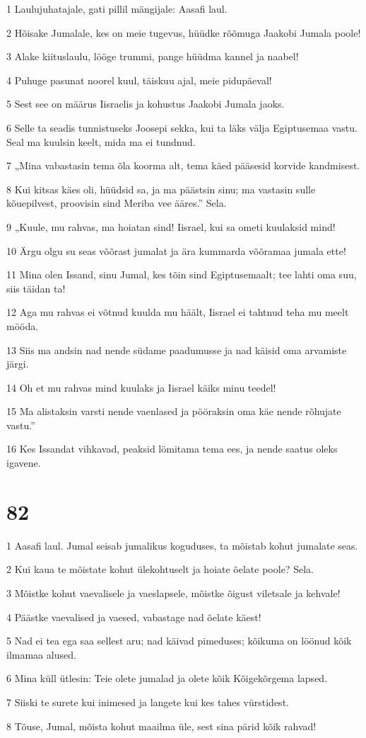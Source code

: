 \par 1 Laulujuhatajale, gati pillil mängijale: Aasafi laul.
\par 2 Hõisake Jumalale, kes on meie tugevus, hüüdke rõõmuga Jaakobi Jumala poole!
\par 3 Alake kiituslaulu, lööge trummi, pange hüüdma kannel ja naabel!
\par 4 Puhuge pasunat noorel kuul, täiskuu ajal, meie pidupäeval!
\par 5 Sest see on määrus Iisraelis ja kohustus Jaakobi Jumala jaoks.
\par 6 Selle ta seadis tunnistuseks Joosepi sekka, kui ta läks välja Egiptusemaa vastu. Seal ma kuulsin keelt, mida ma ei tundnud.
\par 7 „Mina vabastasin tema õla koorma alt, tema käed pääsesid korvide kandmisest.
\par 8 Kui kitsas käes oli, hüüdsid sa, ja ma päästsin sinu; ma vastasin sulle kõuepilvest, proovisin sind Meriba vee ääres.” Sela.
\par 9 „Kuule, mu rahvas, ma hoiatan sind! Iisrael, kui sa ometi kuulaksid mind!
\par 10 Ärgu olgu su seas võõrast jumalat ja ära kummarda võõramaa jumala ette!
\par 11 Mina olen Issand, sinu Jumal, kes tõin sind Egiptusemaalt; tee lahti oma suu, siis täidan ta!
\par 12 Aga mu rahvas ei võtnud kuulda mu häält, Iisrael ei tahtnud teha mu meelt mööda.
\par 13 Siis ma andsin nad nende südame paadumusse ja nad käisid oma arvamiste järgi.
\par 14 Oh et mu rahvas mind kuulaks ja Iisrael käiks minu teedel!
\par 15 Ma alistaksin varsti nende vaenlased ja pööraksin oma käe nende rõhujate vastu.”
\par 16 Kes Issandat vihkavad, peaksid lömitama tema ees, ja nende saatus oleks igavene.

\chapter{82}

\par 1 Aasafi laul. Jumal seisab jumalikus koguduses, ta mõistab kohut jumalate seas.
\par 2 Kui kaua te mõistate kohut ülekohtuselt ja hoiate õelate poole? Sela.
\par 3 Mõistke kohut vaevalisele ja vaeslapsele, mõistke õigust viletsale ja kehvale!
\par 4 Päästke vaevalised ja vaesed, vabastage nad õelate käest!
\par 5 Nad ei tea ega saa sellest aru; nad käivad pimeduses; kõikuma on löönud kõik ilmamaa alused.
\par 6 Mina küll ütlesin: Teie olete jumalad ja olete kõik Kõigekõrgema lapsed.
\par 7 Siiski te surete kui inimesed ja langete kui kes tahes vürstidest.
\par 8 Tõuse, Jumal, mõista kohut maailma üle, sest sina pärid kõik rahvad!

